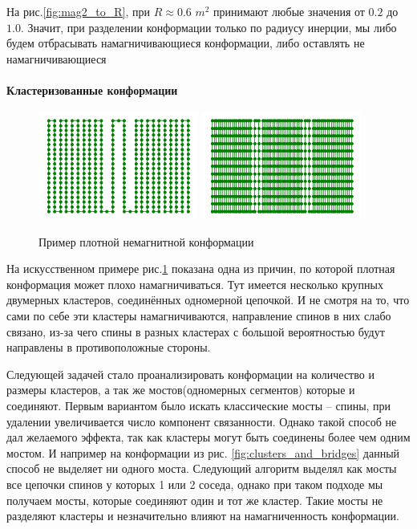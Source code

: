 На рис.\ref{fig:mag2_to_R}, при $R \approx 0.6$ $m^2$ принимают любые значения от $0.2$ до $1.0$. Значит, при разделении конформации только по радиусу инерции, мы либо будем отбрасывать намагничивающиеся конформации, либо оставлять не намагничивающиеся

\paragraph{Кластеризованные конформации}

\begin{figure}[h!]
	\centering
	\includegraphics[width=0.47\textwidth]{../images/2Cluster_conformation.png}
	\includegraphics[width=0.47\textwidth]{../images/3Cluster_conformation.png} 
	\caption{Пример плотной немагнитной конформации}
	\label{fig:synth_cluster_conf}
\end{figure}

На искусственном примере рис.\ref{fig:synth_cluster_conf} показана одна из причин, по которой плотная конформация может плохо намагничиваться. Тут имеется несколько крупных двумерных кластеров, соединённых одномерной цепочкой. И не смотря на то, что сами по себе эти кластеры намагничиваются, направление спинов в них слабо связано, из-за чего спины в разных кластерах с большой вероятностью будут направлены в противоположные стороны.


Следующей задачей стало проанализировать конформации на количество и размеры кластеров, а так же мостов(одномерных сегментов) которые и соединяют. Первым вариантом было искать классические мосты -- спины, при удалении увеличивается число компонент связанности. Однако такой способ не дал желаемого эффекта, так как кластеры могут быть соединены более чем одним мостом. И например на конформации из рис. \ref{fig:clusters_and_bridges} данный способ не выделяет ни одного моста. Следующий алгоритм выделял как мосты все цепочки спинов у которых 1 или 2 соседа, однако при таком подходе мы получаем мосты, которые соединяют один и тот же кластер. Такие мосты не разделяют кластеры и незначительно влияют на намагниченность конформации.


